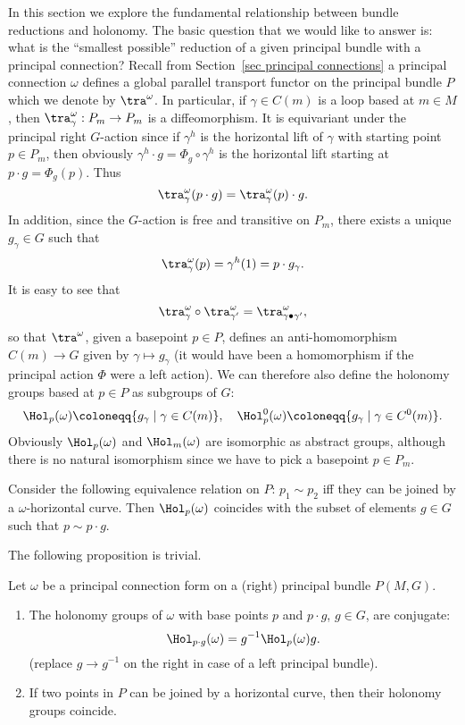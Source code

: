 In this section we explore the fundamental relationship between bundle reductions and holonomy. The basic question that we would like to answer is: what is the ``smallest possible'' reduction of a given principal bundle with a principal connection? Recall from Section~\ref{sec principal connections} a principal connection $\omega$ defines a global parallel transport functor on the principal bundle $P$ which we denote by $\tra^\omega$. In particular, if $\gamma\in C(m)$ is a loop based at $m\in M$, then $\tra^\omega_\gamma:P_m\to P_m$ is a diffeomorphism. It is equivariant under the principal right $G$-action since if $\gamma^h$ is the horizontal lift of $\gamma$ with starting point $p\in P_m$, then obviously $\gamma^h\cdot g=\Phi_g\circ\gamma^h$ is the horizontal lift starting at $p\cdot g=\Phi_g(p)$. Thus
\[\tra_\gamma^\omega(p\cdot g)=\tra_\gamma^\omega(p)\cdot g.\label{eq 1.7.4 RS2}\]
In addition, since the $G$-action is free and transitive on $P_m$, there exists a unique $g_\gamma\in G$ such that
\[\tra_\gamma^\omega(p)=\gamma^h(1)=p\cdot g_\gamma.\label{eq 1.7.5 RS2}\]
It is easy to see that
\[\tra_{\gamma}^\omega\circ\tra_{\gamma'}^\omega=\tra_{\gamma\bullet\gamma'}^\omega,\]
so that $\tra^\omega$, given a basepoint $p\in P$, defines an anti-homomorphism $C(m)\to G$ given by $\gamma\mapsto g_\gamma$ (it would have been a homomorphism if the principal action $\Phi$ were a left action). We can therefore also define the holonomy groups based at $p\in P$ as subgroups of $G$:
\[\Hol_p(\omega)\coloneqq \{g_\gamma \mid \gamma\in C(m)\}, \quad \Hol_p^0(\omega)\coloneqq\{g_\gamma \mid \gamma\in C^0(m)\}.\]
Obviously $\Hol_p(\omega)$ and $\Hol_m(\omega)$ are isomorphic as abstract groups, although there is no natural isomorphism since we have to pick a basepoint $p\in P_m$.

\begin{rem}\label{rem 1.7.7 RS2}
    Consider the following equivalence relation on $P$: $p_1\sim p_2$ iff they can be joined by a $\omega$-horizontal curve. Then $\Hol_p(\omega)$ coincides with the subset of elements $g\in G$ such that $p\sim p\cdot g$.
\end{rem}

The following proposition is trivial.
\begin{prop}[{{\cite[Prop.~1.7.8]{RS2}}}]\label{prop 1.7.8 RS2}
    Let $\omega$ be a principal connection form on a (right) principal bundle $P(M,G)$. 
    \begin{enumerate}
        \item The holonomy groups of $\omega$ with base points $p$ and $p\cdot g$, $g\in G$, are conjugate:
        \[\Hol_{p\cdot g}(\omega)=g^{-1}\Hol_{p}(\omega)g.\]
        (replace $g\to g^{-1}$ on the right in case of a left principal bundle).

        \item If two points in $P$ can be joined by a horizontal curve, then their holonomy groups coincide.
    \end{enumerate}
\end{prop}


